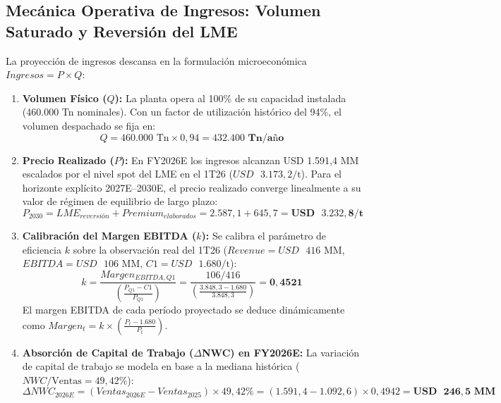 \documentclass[10pt,a4paper]{article}
\begin{document}
\subsection{Mecánica Operativa de Ingresos: Volumen Saturado y Reversión del LME}
La proyección de ingresos descansa en la formulación microeconómica $Ingresos = P \times Q$:
\begin{enumerate}
    \item \textbf{Volumen Físico ($Q$):} La planta opera al 100\% de su capacidad instalada (460.000 Tn nominales). Con un factor de utilización histórico del 94\%, el volumen despachado se fija en:
    \begin{equation}
        Q = 460.000\text{ Tn} \times 0,94 = \mathbf{432.400\text{ Tn/año}}
    \end{equation}
    \item \textbf{Precio Realizado ($P$):} En FY2026E los ingresos alcanzan USD 1.591,4 MM escalados por el nivel spot del LME en el 1T26 ($USD\text{ }3.173,2/\text{t}$). Para el horizonte explícito 2027E--2030E, el precio realizado converge linealmente a su valor de régimen de equilibrio de largo plazo:
    \begin{equation}
        P_{2030} = LME_{reversión} + Premium_{elaborados} = 2.587,1 + 645,7 = \mathbf{USD\text{ }3.232,8/\text{t}}
    \end{equation}
    \item \textbf{Calibración del Margen EBITDA ($k$):} Se calibra el parámetro de eficiencia $k$ sobre la observación real del 1T26 ($Revenue = USD\text{ }416\text{ MM}$, $EBITDA = USD\text{ }106\text{ MM}$, $C1 = USD\text{ }1.680/\text{t}$):
    \begin{equation}
        k = \frac{Margen_{EBITDA, Q1}}{\left(\frac{P_{Q1} - C1}{P_{Q1}}\right)} = \frac{106 / 416}{\left(\frac{3.848,3 - 1.680}{3.848,3}\right)} = \mathbf{0,4521}
    \end{equation}
    El margen EBITDA de cada período proyectado se deduce dinámicamente como $Margen_t = k \times \left(\frac{P_t - 1.680}{P_t}\right)$.
    \item \textbf{Absorción de Capital de Trabajo ($\Delta$NWC) en FY2026E:} La variación de capital de trabajo se modela en base a la mediana histórica ($NWC/\text{Ventas} = 49,42\%$):
    \begin{equation}
        \Delta NWC_{2026E} = (Ventas_{2026E} - Ventas_{2025}) \times 49,42\% = (1.591,4 - 1.092,6) \times 0,4942 = \mathbf{USD\text{ }246,5\text{ MM}}
    \end{equation}

\end{enumerate}
\end{document}
